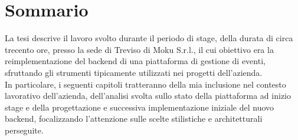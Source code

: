 
\cleardoublepage
{}
{}
\begingroup
\let\clearpage\relax
\let\cleardoublepage\relax
\let\cleardoublepage\relax

\chapter*{Sommario}

La tesi descrive il lavoro svolto durante il periodo di stage, della durata di circa trecento ore, presso la sede di Treviso di Moku S.r.l., il cui obiettivo era la reimplementazione del backend di una piattaforma di gestione di eventi, sfruttando gli strumenti tipicamente utilizzati nei progetti dell'azienda. \\
In particolare, i seguenti capitoli tratteranno della mia inclusione nel contesto lavorativo dell'azienda, dell'analisi svolta sullo stato della piattaforma ad inizio stage e della progettazione e successiva implementazione iniziale del nuovo backend, focalizzando l'attenzione sulle scelte stilistiche e architetturali perseguite.

%
%

\endgroup			

\vfill
